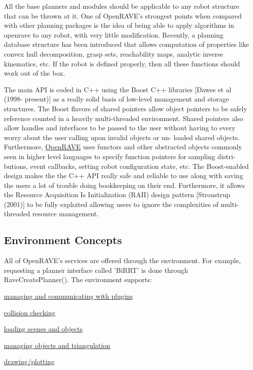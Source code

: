 All the base planners and modules should be applicable to any robot structure that can be thrown at it. One of OpenRAVE's strongest points when compared with other planning packages is the idea of being able to apply algorithms in openrave to any robot, with very little modification. Recently, a planning database structure has been introduced that allows computation of properties like convex hull decomposition, grasp sets, reachability maps, analytic inverse kinematics, etc. If the robot is defined properly, then all these functions should work out of the box.

The main API is coded in C++ using the Boost C++ libraries \mbox{[}Dawes et al (1998-\/ present)\mbox{]} as a really solid basis of low-\/level management and storage structures. The Boost flavors of shared pointers allow object pointers to be safely reference counted in a heavily multi-\/threaded environment. Shared pointers also allow handles and interfaces to be passed to the user without having to every worry about the user calling upon invalid objects or un-\/ loaded shared objects. Furthermore, \hyperlink{namespaceOpenRAVE}{OpenRAVE} uses functors and other abstracted objects commonly seen in higher level languages to specify function pointers for sampling distri-\/ butions, event callbacks, setting robot configuration state, etc. The Boost-\/enabled design makes the the C++ API really safe and reliable to use along with saving the users a lot of trouble doing bookkeeping on their end. Furthermore, it allows the Resource Acquisition Is Initialization (RAII) design pattern \mbox{[}Stroustrup (2001)\mbox{]} to be fully exploited allowing users to ignore the complexities of multi-\/threaded resource management.\hypertarget{architecture__concepts_arch_environment}{}\subsection{Environment Concepts}\label{architecture__concepts_arch_environment}
All of OpenRAVE's services are offered through the environment. For example, requesting a planner interface called 'BiRRT' is done through RaveCreatePlanner(). The environment supports:


\begin{DoxyItemize}
\item \hyperlink{namespaceOpenRAVE_global_functionality}{managing and communicating with plugins}
\item \hyperlink{classOpenRAVE_1_1EnvironmentBase_env_collision_checking}{collision checking}
\item \hyperlink{classOpenRAVE_1_1EnvironmentBase_env_loading}{loading scenes and objects}
\item \hyperlink{classOpenRAVE_1_1EnvironmentBase_env_objects}{managing objects and triangulation}
\item \hyperlink{classOpenRAVE_1_1EnvironmentBase_env_plotting}{drawing/plotting}
\end{DoxyItemize}


